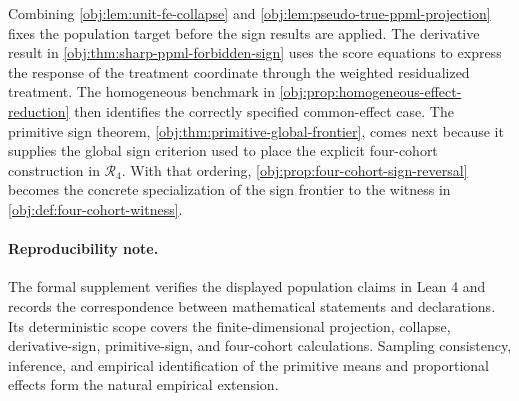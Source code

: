 Combining \cref{obj:lem:unit-fe-collapse} and \cref{obj:lem:pseudo-true-ppml-projection} fixes the population target before the sign results are applied. The derivative result in \cref{obj:thm:sharp-ppml-forbidden-sign} uses the score equations to express the response of the treatment coordinate through the weighted residualized treatment. The homogeneous benchmark in \cref{obj:prop:homogeneous-effect-reduction} then identifies the correctly specified common-effect case. The primitive sign theorem, \cref{obj:thm:primitive-global-frontier}, comes next because it supplies the global sign criterion used to place the explicit four-cohort construction in \(\mathcal R_4\). With that ordering, \cref{obj:prop:four-cohort-sign-reversal} becomes the concrete specialization of the sign frontier to the witness in \cref{obj:def:four-cohort-witness}.

\paragraph{Reproducibility note.}
The formal supplement verifies the displayed population claims in Lean 4 and records the correspondence between mathematical statements and declarations. Its deterministic scope covers the finite-dimensional projection, collapse, derivative-sign, primitive-sign, and four-cohort calculations. Sampling consistency, inference, and empirical identification of the primitive means and proportional effects form the natural empirical extension.
